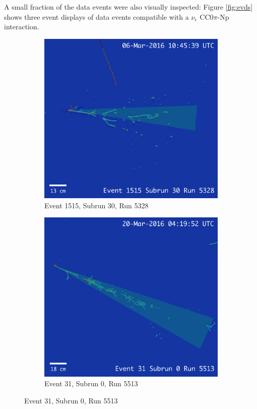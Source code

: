A small fraction of the data events were also visually inspected: Figure \ref{fig:evds} shows three event displays of data events compatible with a $\nu_{e}$ CC0$\pi$-Np interaction. 

\begin{figure}[htbp]
\centering
  \begin{subfigure}{0.45\textwidth}
  \includegraphics[width=\linewidth]{figures/data3.png}
    \caption{Event 1515, Subrun 30, Run 5328}\end{subfigure}
  \hspace{1em}\begin{subfigure}{0.45\textwidth}	
  \includegraphics[width=\linewidth]{figures/data2.png}
  \caption{Event 31, Subrun 0, Run 5513}
\end{subfigure}
\vspace{1em}


\end{figure}
